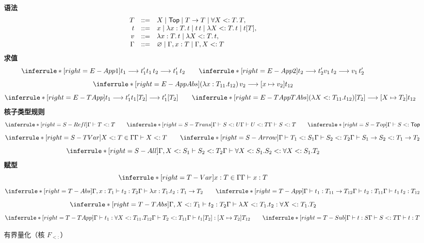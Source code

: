 \begin{figure}[!ht]
\centering
\begin{minipage}{0.96\linewidth}
\textbf{语法}
\[
\begin{array}{rcl}
T&::=&X\mid\mathsf{Top}\mid T\to T\mid\forall X<:T.\,T,\\
t&::=&x\mid\lambda x:T.\,t\mid t\,t
\mid\lambda X<:T.\,t\mid t[T],\\
v&::=&\lambda x:T.\,t\mid\lambda X<:T.\,t,\\
\Gamma&::=&\varnothing\mid\Gamma,x:T\mid\Gamma,X<:T
\end{array}
\]
\textbf{求值}
\[
\inferrule*[right=E-App1]{t_1\longrightarrow t_1'}
 {t_1\,t_2\longrightarrow t_1'\,t_2}
\qquad
\inferrule*[right=E-App2]{t_2\longrightarrow t_2'}
 {v_1\,t_2\longrightarrow v_1\,t_2'}
\]
\[
\inferrule*[right=E-AppAbs]{ }
 {(\lambda x:T_{11}.t_{12})\,v_2
  \longrightarrow[x\mapsto v_2]t_{12}}
\]
\[
\inferrule*[right=E-TApp]{t_1\longrightarrow t_1'}
 {t_1[T_2]\longrightarrow t_1'[T_2]}
\qquad
\inferrule*[right=E-TAppTAbs]{ }
 {(\lambda X<:T_{11}.t_{12})[T_2]
  \longrightarrow[X\mapsto T_2]t_{12}}
\]
\textbf{核子类型规则}
\[
\inferrule*[right=S-Refl]{ }{\Gamma\vdash T<:T}
\qquad
\inferrule*[right=S-Trans]
 {\Gamma\vdash S<:U\\\Gamma\vdash U<:T}
 {\Gamma\vdash S<:T}
\qquad
\inferrule*[right=S-Top]{ }{\Gamma\vdash S<:\tapltype{Top}}
\]
\[
\inferrule*[right=S-TVar]
 {X<:T\in\Gamma}
 {\Gamma\vdash X<:T}
\qquad
\inferrule*[right=S-Arrow]
 {\Gamma\vdash T_1<:S_1\\\Gamma\vdash S_2<:T_2}
 {\Gamma\vdash S_1\to S_2<:T_1\to T_2}
\]
\[
\inferrule*[right=S-All]
 {\Gamma,X<:S_1\vdash S_2<:T_2}
 {\Gamma\vdash
  \forall X<:S_1.S_2<:\forall X<:S_1.T_2}
\]
\textbf{赋型}
\[
\inferrule*[right=T-Var]{x:T\in\Gamma}{\Gamma\vdash x:T}
\]
\[
\inferrule*[right=T-Abs]{\Gamma,x:T_1\vdash t_2:T_2}
 {\Gamma\vdash\lambda x:T_1.t_2:T_1\to T_2}
\qquad
\inferrule*[right=T-App]
 {\Gamma\vdash t_1:T_{11}\to T_{12}\\\Gamma\vdash t_2:T_{11}}
 {\Gamma\vdash t_1\,t_2:T_{12}}
\]
\[
\inferrule*[right=T-TAbs]
 {\Gamma,X<:T_1\vdash t_2:T_2}
 {\Gamma\vdash\lambda X<:T_1.t_2:\forall X<:T_1.T_2}
\]
\[
\inferrule*[right=T-TApp]
 {\Gamma\vdash t_1:\forall X<:T_{11}.T_{12}\\
  \Gamma\vdash T_2<:T_{11}}
 {\Gamma\vdash t_1[T_2]:[X\mapsto T_2]T_{12}}
\qquad
\inferrule*[right=T-Sub]
 {\Gamma\vdash t:S\\\Gamma\vdash S<:T}
 {\Gamma\vdash t:T}
\]
\end{minipage}
\caption{有界量化（核 \(F_{<:}\)）}
\label{fig:26-1}
\end{figure}

